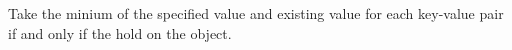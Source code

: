 Take the minium of the specified value and existing value for each key-value
pair if and only if the  hold on the object.



